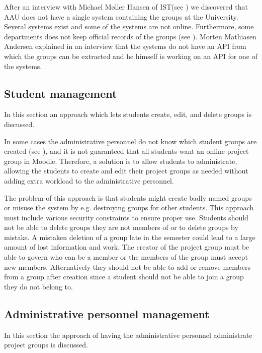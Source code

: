 After an interview with Michael Møller Hansen of IST(see ) we discovered that AAU does not have a single system containing the groups at the University.
Several systems exist and some of the systems are not online.
Furthermore, some departments does not keep official records of the groups (see ).
Morten Mathiasen Andersen explained in an interview that the systems do not have an API from which the groups can be extracted and he himself is working on an API for one of the systems.





\subsection{Student management}
In this section an approach which lets students create, edit, and delete groups is discussed. 

In some cases the administrative personnel do not know which student groups are created (see ), and it is not guaranteed that all students want an online project group in Moodle. 
Therefore, a solution is to allow students to administrate, allowing the students to create and edit their project groups as needed without adding extra workload to the administrative personnel.

The problem of this approach is that students might create badly named groups or misuse the system by e.g. destroying groups for other students. 
This approach must include various security constraints to ensure proper use. 
Students should not be able to delete groups they are not members of or to delete groups by mistake. 
A mistaken deletion of a group late in the semester could lead to a large amount of lost information and work. 
The creator of the project group must be able to govern who can be a member or the members of the group must accept new members.
Alternatively they should not be able to add or remove members from a group after creation since a student should not be able to join a group they do not belong to. 


\subsection{Administrative personnel management}
In this section the approach of having the administrative personnel administrate project groups is discussed. 

